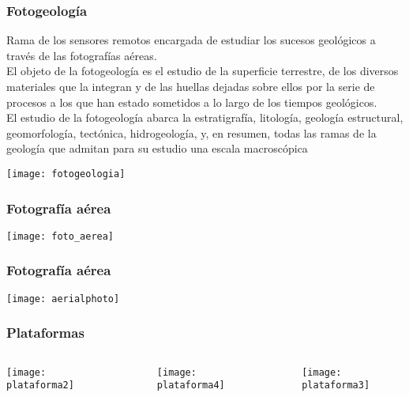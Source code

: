 \documentclass[14pt]{beamer}
\begin{document}
\begin{frame}
\frametitle{Fotogeología}
\scriptsize{
Rama de los sensores remotos encargada de estudiar los sucesos geológicos a través de las fotografías aéreas.\\ 
El objeto de la fotogeología es el estudio de la superficie terrestre, de los diversos materiales que la integran y de las huellas dejadas sobre ellos por la serie de procesos a los que han estado sometidos a lo largo de los tiempos geológicos. \\
El estudio de la fotogeología abarca la estratigrafía, litología, geología estructural, geomorfología, tectónica, hidrogeología, y, en resumen, todas las ramas de la geología que admitan para su estudio una escala macroscópica
}
\begin{center}
\texttt{[image: fotogeologia]}
\end{center}
\end{frame}
\begin{frame}
\frametitle{Fotografía aérea}
\begin{center}
\texttt{[image: foto\_aerea]}
\end{center}
\end{frame}
\begin{frame}
\frametitle{Fotografía aérea}
\begin{center}
\texttt{[image: aerialphoto]}
\end{center}
\end{frame}
\begin{frame}
\frametitle{Plataformas}
\begin{columns}
\begin{column}{0.35\linewidth}
\begin{center}
\texttt{[image: plataforma2]}
\end{center}
\end{column}
\begin{column}{0.33\linewidth}
\begin{figure}
\texttt{[image: plataforma4]}
\end{figure}
\end{column}
\begin{column}{0.33\linewidth}
\begin{center}
\texttt{[image: plataforma3]}
\end{center}
\end{column}
\end{columns}
\end{frame}
\end{document}
